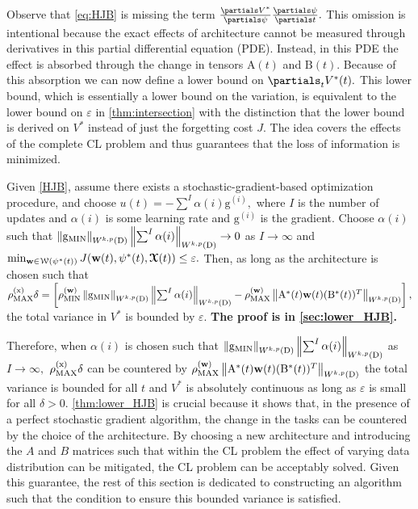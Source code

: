 Observe that \eqref{eq:HJB} is missing the term $\frac{\partials V^*}{\partials \psi}\frac{\partials \psi}{\partials t}.$ This omission is intentional because the exact effects of architecture cannot be measured through derivatives in this partial differential equation (PDE). Instead, in this PDE the effect is absorbed through the change in tensors $\mathrm{A}(t)$ and $\mathrm{B}(t)$.
Because of this absorption we can now define a lower bound on $\partials_{t} V^*(t).$ This lower bound, which is essentially a lower bound on the variation, is equivalent to the lower bound on $\varepsilon$ in \cref{thm:intersection} with the distinction that the lower bound is derived on $V^*$ instead of just the forgetting cost $J.$ The idea covers the effects of the complete CL problem and thus guarantees that the loss of information is minimized.
\begin{theorem}\label{thm:lower_HJB}
Given \cref{HJB}, assume there exists a stochastic-gradient-based optimization procedure,  and choose $ u(t) =- \sum^{I} \alpha(i) \mathrm{g}^{(i)},$ where $I$ is the number of updates and $\alpha(i)$ is some learning rate and $\mathrm{g}^{(i)}$ is the gradient. Choose $\alpha(i)$ such that $\left \|\mathrm{g}_{\mathrm{MIN} } \right\|_{W^{k,p}(\mathrm{D})}  \left \|\sum^{I} \alpha(i)  \right\|_{W^{k,p}(\mathrm{D})} \rightarrow 0$ as $I \rightarrow \infty$ and $\min_{\boldsymbol{\mathrm{w}} \in \mathcal{W}(\psi^*(t))} J(\boldsymbol{\mathrm{w}}(t),\psi^*(t),\boldsymbol{\mathcal{X}}(t)) \leq \varepsilon.$ Then, as long as the architecture is chosen such that $   \rho^{(\mathrm{x})}_{\mathrm{MAX}} \delta = \left[ \rho^{(\boldsymbol{\mathrm{w}})}_{\mathrm{MIN}} \left \|\mathrm{g}_{\mathrm{MIN} } \right\|_{W^{k,p}(\mathrm{D})}  \left \|\sum^{I} \alpha(i)  \right\|_{W^{k,p}(\mathrm{D})} - \rho^{(\boldsymbol{\mathrm{w}})}_{\mathrm{MAX}} \left \|\mathrm{A}^*(t)\boldsymbol{\mathrm{w}}(t)( \mathrm{B}^*(t))^T \right\|_{W^{k,p}(\mathrm{D})} \right],$  the total variance in $V^*$ is bounded by $\varepsilon.$ \textbf{The proof is in \cref{sec:lower_HJB}.}
\end{theorem}
Therefore, when $\alpha(i)$ is chosen such that $\left \|\mathrm{g}_{\mathrm{MIN} } \right\|_{W^{k,p}(\mathrm{D})}  \left \|\sum^{I} \alpha(i)  \right\|_{W^{k,p}(\mathrm{D})} $ as $I \rightarrow \infty,$ $\rho^{(\mathrm{x})}_{\mathrm{MAX}} \delta$ can be countered by 
$\rho^{(\boldsymbol{\mathrm{w}})}_{\mathrm{MAX}} \left \|\mathrm{A}^*(t)\boldsymbol{\mathrm{w}}(t)( \mathrm{B}^*(t))^T \right\|_{W^{k,p}(\mathrm{D})}$ the total variance is bounded for all $t$ and $V^*$ is absolutely continuous as long as $\varepsilon$ is small for all $\delta >0.$ \cref{thm:lower_HJB} is crucial because it shows that, in the presence of a perfect stochastic gradient algorithm, the change in the tasks can be countered by the choice of the architecture. By choosing a new architecture and introducing the $A$ and $B$ matrices such that within the CL problem the effect of varying data distribution can be mitigated,  the CL problem can be acceptably solved. Given this guarantee, the rest of this section is dedicated to constructing an algorithm such that the condition to ensure this bounded variance is satisfied. 


